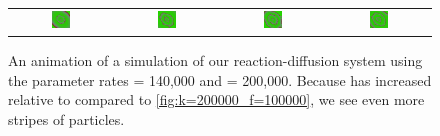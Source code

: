\begin{figure}[h]
\begin{tabular}{c c c c}
\includegraphics[width = 0.19\textwidth]{../images_CMYK/predator_prey_11_by_11_f_1.4_k_2_i4} & \includegraphics[width = 0.19\textwidth]{../images_CMYK/../images_CMYK/predator_prey_11_by_11_f_1.4_k_2_i5} & \includegraphics[width = 0.19\textwidth]{../images_CMYK/../images_CMYK/predator_prey_11_by_11_f_1.4_k_2_i6} & \includegraphics[width = 0.19\textwidth]{../images_CMYK/../images_CMYK/predator_prey_11_by_11_f_1.4_k_2_i7}
\end{tabular}
\caption{An animation of a simulation of our reaction-diffusion system using the parameter rates  = 140,000 and  = 200,000. Because  has increased relative to  compared to \autoref{fig:k=200000_f=100000}, we see even more stripes of  particles.}
\label{fig:k=200000_f=140000}
\end{figure}

